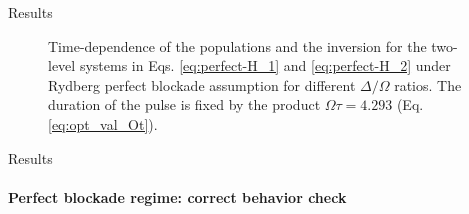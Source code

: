 \documentclass[8pt]{beamer}
\begin{document}
\begin{frame}{Results}
\begin{figure}[h!]
\begin{minipage}[]{0.49\linewidth}
        \end{minipage}
        \caption{Time-dependence of the populations and the inversion for the two-level systems in Eqs. \eqref{eq:perfect-H_1} and \eqref{eq:perfect-H_2} under Rydberg perfect blockade assumption for different $\Delta/\Omega$ ratios. The duration of the pulse is fixed by the product $\Omega \tau = 4.293$ (Eq. \eqref{eq:opt_val_Ot}). }
        \label{fig:population_perfect-blockade}
        \end{figure}    
    
    \end{frame}
    
	\begin{frame}{Results}
	\framesubtitle{Perfect blockade regime: correct behavior check}    
        \begin{figure}[H]
        \begin{minipage}[c]{0.49\linewidth}
        \end{minipage}
        \begin{minipage}[]{0.49\linewidth}
        \centering

\end{minipage}
\end{figure}
\end{frame}
\end{document}
